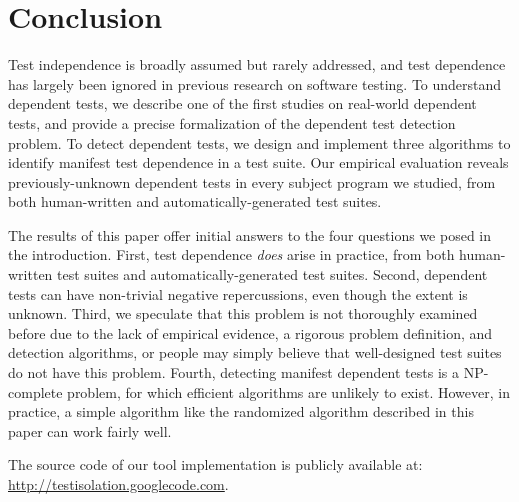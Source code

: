 \section{Conclusion}
\label{sec:questions}

Test independence is broadly assumed but rarely addressed, and
test dependence has largely been ignored in previous
research on software testing. To understand
dependent tests, we describe one of the first studies on
real-world dependent tests, and
provide a precise formalization of the dependent test detection
problem. To detect dependent tests, we design
and implement three algorithms to identify manifest test dependence
in a test suite. Our empirical evaluation reveals
previously-unknown dependent tests in every subject program
we studied, from both human-written and automatically-generated test
suites.

The results of this paper offer initial answers to the four questions we posed
in the introduction. First, test dependence \textit{does}
arise in practice, from both human-written test suites and automatically-generated
test suites. Second, dependent tests can have
non-trivial negative repercussions, even though the
extent is unknown. Third, we speculate that this
problem is not thoroughly examined before due to the
lack of empirical evidence, a rigorous problem definition,
and detection algorithms, or people may simply believe that well-designed
test suites do not have this problem.
Fourth,
detecting manifest dependent tests is a NP-complete problem,
for which efficient algorithms are unlikely to exist. However,
in practice, a simple algorithm like the randomized algorithm
described in this paper can work fairly well.

The source code of our tool implementation is publicly
available at: \url{http://testisolation.googlecode.com}.
